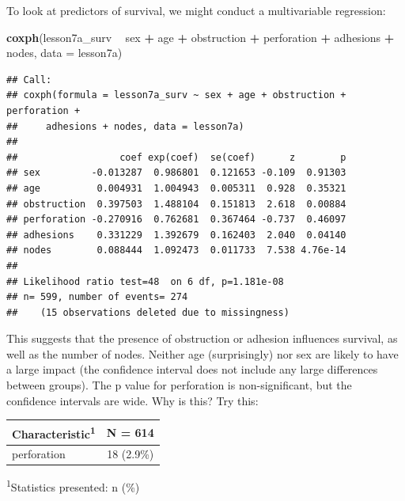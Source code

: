 \documentclass[]{book}
\newenvironment{Shaded}{\begin{snugshade}}{\end{snugshade}}
\newcommand{\DataTypeTok}[1]{\textcolor[rgb]{0.13,0.29,0.53}{#1}}
\newcommand{\KeywordTok}[1]{\textcolor[rgb]{0.13,0.29,0.53}{\textbf{#1}}}
\newcommand{\NormalTok}[1]{#1}
\newcommand{\OperatorTok}[1]{\textcolor[rgb]{0.81,0.36,0.00}{\textbf{#1}}}
\newcommand{\StringTok}[1]{\textcolor[rgb]{0.31,0.60,0.02}{#1}}
\begin{document}
To look at predictors of survival, we might conduct a multivariable
regression:

\begin{Shaded}
\begin{Highlighting}[]
\KeywordTok{coxph}\NormalTok{(lesson7a_surv }\OperatorTok{~}\StringTok{ }\NormalTok{sex }\OperatorTok{+}\StringTok{ }\NormalTok{age }\OperatorTok{+}\StringTok{ }\NormalTok{obstruction }\OperatorTok{+}\StringTok{ }\NormalTok{perforation }\OperatorTok{+}\StringTok{ }\NormalTok{adhesions }\OperatorTok{+}\StringTok{ }\NormalTok{nodes,}
      \DataTypeTok{data =}\NormalTok{ lesson7a)}
\end{Highlighting}
\end{Shaded}

\begin{verbatim}
## Call:
## coxph(formula = lesson7a_surv ~ sex + age + obstruction + perforation + 
##     adhesions + nodes, data = lesson7a)
## 
##                  coef exp(coef)  se(coef)      z        p
## sex         -0.013287  0.986801  0.121653 -0.109  0.91303
## age          0.004931  1.004943  0.005311  0.928  0.35321
## obstruction  0.397503  1.488104  0.151813  2.618  0.00884
## perforation -0.270916  0.762681  0.367464 -0.737  0.46097
## adhesions    0.331229  1.392679  0.162403  2.040  0.04140
## nodes        0.088444  1.092473  0.011733  7.538 4.76e-14
## 
## Likelihood ratio test=48  on 6 df, p=1.181e-08
## n= 599, number of events= 274 
##    (15 observations deleted due to missingness)
\end{verbatim}

This suggests that the presence of obstruction or adhesion influences
survival, as well as the number of nodes. Neither age (surprisingly) nor
sex are likely to have a large impact (the confidence interval does not
include any large differences between groups). The p value for
perforation is non-significant, but the confidence intervals are wide.
Why is this? Try this:

\begin{Shaded}
\end{Shaded}

\captionsetup[table]{labelformat=empty,skip=1pt}
\begin{longtable}{lc}
\toprule
\textbf{Characteristic}\textsuperscript{1} & \textbf{N = 614} \\ 
\midrule
perforation & 18 (2.9\%) \\ 
\bottomrule
\end{longtable}
\vspace{-5mm}
\begin{minipage}{\linewidth}
\textsuperscript{1}Statistics presented: n (\%) \\ 
\end{minipage}
\end{document}
